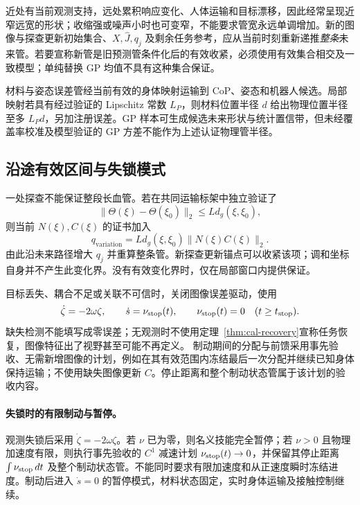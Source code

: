\documentclass[11pt,a4paper]{article}
\numberwithin{equation}{section}
\theoremstyle{definition}
\begin{document}
近处有当前观测支持，远处累积响应变化、人体运输和目标漂移，因此经常呈现近窄远宽的形状；收缩强或噪声小时也可变窄，不能要求管宽永远单调增加。新的图像与探查更新初始集合、$X,\widehat J,q_j$ 及剩余任务参考，应从当前时刻重新递推\emph{整条}未来管。若要宣称新管是旧预测管条件化后的有效收紧，必须使用有效集合相交及一致模型；单纯替换 GP 均值不具有这种集合保证。

材料与姿态误差管经当前有效的身体映射运输到 CoP、姿态和机器人候选。局部映射若具有经过验证的 Lipschitz 常数 $L_P$，则材料位置半径 $d$ 给出物理位置半径至多 $L_Pd$，另加注册误差。GP 样本可生成候选未来形状与统计置信带，但未经覆盖率校准及模型验证的 GP 方差不能作为上述认证物理管半径。

\subsection{沿途有效区间与失锁模式}

一处探查不能保证整段长血管。若在共同运输标架中独立验证了
\begin{equation}
 \|\Theta(\xi)-\Theta(\xi_0)\|_2
      \le Ld_g(\xi,\xi_0),
 \label{eq:cal-spatial-variation}
\end{equation}
则当前 $N(\xi),C(\xi)$ 的证书加入
\begin{equation}
 q_{\mathrm{variation}}=
    Ld_g(\xi,\xi_0)\|N(\xi)C(\xi)\|_2.
 \label{eq:cal-variation-q}
\end{equation}
由此沿未来路径增大 $q_j$ 并重算整条管。新探查更新锚点可以收紧该项；调和坐标自身并不产生此变化界。没有有效变化界时，仅在局部窗口内提供保证。

目标丢失、耦合不足或关联不可信时，关闭图像误差驱动，使用
\begin{equation}
 \dot\zeta=-2\omega\zeta,\qquad\dot s=\nu_{\rm stop}(t),
 \qquad \nu_{\rm stop}(t)=0\quad(t\ge t_{\rm stop}).
 \label{eq:cal-loss-mode}
\end{equation}
缺失检测不能填写成零误差；无观测时不使用定理~\ref{thm:cal-recovery}宣称任务恢复，图像特征出了视野甚至可能不再定义。
制动期间的分配与前馈采用事先验收、无需新增图像的计划，例如在其有效范围内冻结最后一次分配并继续已知身体保持运输；不使用缺失图像更新 $C$。停止距离和整个制动状态管属于该计划的验收内容。

\paragraph{失锁时的有限制动与暂停。}
观测失锁后采用 $\dot\zeta=-2\omega\zeta$。若 $\nu$ 已为零，则名义技能完全暂停；若 $\nu>0$ 且物理加速度有限，则执行事先验收的 $C^1$ 减速计划 $\nu_{\rm stop}(t)\to0$，并保留其停止距离 $\int\nu_{\rm stop}\,dt$ 及整个制动状态管。不能同时要求有限加速度和从正速度瞬时冻结进度。制动后进入 $\dot s=0$ 的暂停模式，材料状态固定，实时身体运输及接触控制继续。
\end{document}

